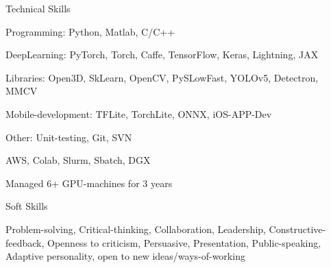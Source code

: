 \documentclass{resume_short} %
\begin{document}
\begin{paracol}{2}
\begin{rSection}{Technical Skills}{} 
\begin{sSubsection}{{Programming}: Python, Matlab, C/C++}\end{sSubsection}
\begin{sSubsection}{{DeepLearning}: PyTorch, Torch, Caffe, TensorFlow, Keras, Lightning, JAX}\end{sSubsection}
\begin{sSubsection}{{Libraries}: Open3D, SkLearn, OpenCV, PySLowFast, YOLOv5, Detectron, MMCV}\end{sSubsection}
\begin{sSubsection}{{Mobile-development}: TFLite, TorchLite, ONNX, iOS-APP-Dev}\end{sSubsection}
\begin{sSubsection}{{Other}: Unit-testing, Git, SVN}\end{sSubsection} %
\begin{sSubsection}{AWS, Colab, Slurm, Sbatch, DGX}\end{sSubsection}
\begin{sSubsection}{Managed 6+ GPU-machines for 3 years}\end{sSubsection}
\end{rSection}

\begin{rSection}{Soft Skills}{} 
  \begin{sSubsection}{Problem-solving, Critical-thinking, Collaboration, Leadership, 
  Constructive-feedback, Openness to criticism, Persuasive, Presentation, Public-speaking, Adaptive personality, open to new ideas/ways-of-working}\end{sSubsection}
    

\end{rSection}
\end{paracol}
\end{document}
